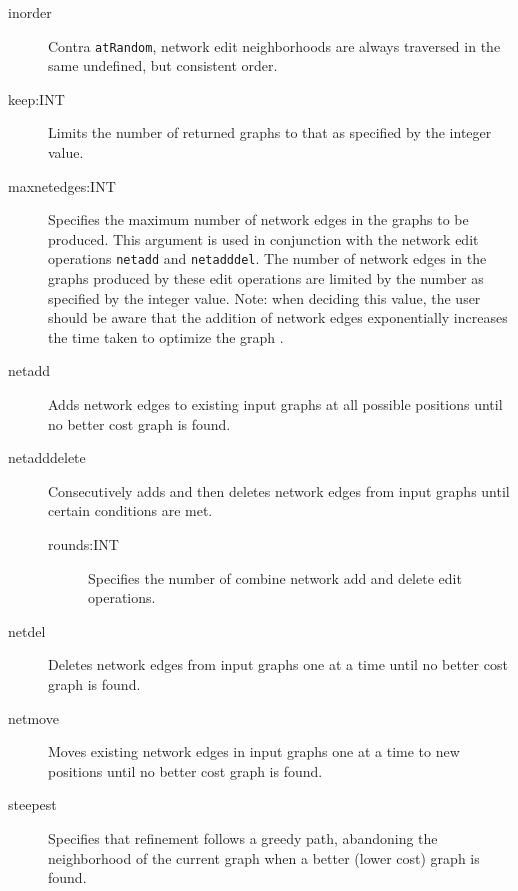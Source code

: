 \begin{description}
		\item[inorder] Contra \texttt{atRandom}, network edit neighborhoods are always traversed 
		in the same undefined, but consistent order.

		\item[keep:INT] Limits the number of returned graphs to that as specified by the 
		integer value. 
		
		\item[maxnetedges:INT] Specifies the maximum number of network edges in the graphs 
		to be produced. 
		This argument is used in conjunction with the network edit operations \texttt{netadd} and 
		\texttt{netadddel}. The number of network edges in the graphs produced by these edit operations 
		are limited by the number as specified by the integer value.
		Note: when deciding this value, the user should be aware that the addition of network 
		edges exponentially increases the time taken to optimize the graph 
		\cite{WheelerandWashburn2023}.
				
		\item[netadd] Adds network edges to existing input graphs at all possible positions 
		until no better cost graph is found.
			
		\item[netadddelete] Consecutively adds and then deletes network edges from 
		input graphs until certain conditions are met.
			
			\begin{description}
			\item[rounds:INT]  Specifies the number of combine network add and delete
			edit operations.
			\end{description}
			
		\item[netdel] Deletes network edges from input graphs one at a time until no better 
		cost 	graph is found.
			
		\item[netmove] Moves existing network edges in input graphs one at a time to new 
		positions until no better cost graph is found.
		
		
		\item[steepest] Specifies that refinement follows a greedy path, abandoning the 
		neighborhood of the current graph when a better (lower cost) graph is found. 
	\end{description}

